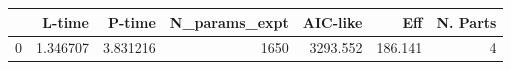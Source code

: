 \begin{tabular}{lrrrrrr}
\toprule
{} &    L-time &    P-time &  N\_params\_expt &  AIC-like &      Eff &  N. Parts \\
\midrule
0 &  1.346707 &  3.831216 &           1650 &  3293.552 &  186.141 &         4 \\
\bottomrule
\end{tabular}
